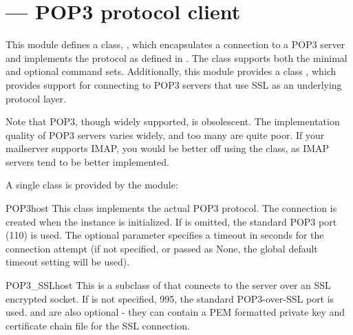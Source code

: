 \section{ ---
         POP3 protocol client}




This module defines a class, , which encapsulates a
connection to a POP3 server and implements the protocol as defined in
.  The  class supports both the minimal and
optional command sets. Additionally, this module provides a class
, which provides support for connecting to POP3
servers that use SSL as an underlying protocol layer.


Note that POP3, though widely supported, is obsolescent.  The
implementation quality of POP3 servers varies widely, and too many are
quite poor. If your mailserver supports IMAP, you would be better off
using the  class, as IMAP
servers tend to be better implemented.

A single class is provided by the  module:

\begin{classdesc}{POP3}{host}
This class implements the actual POP3 protocol.  The connection is
created when the instance is initialized.
If  is omitted, the standard POP3 port (110) is used.
The optional  parameter specifies a timeout in seconds for the
connection attempt (if not specified, or passed as None, the global default
timeout setting will be used).
\end{classdesc}

\begin{classdesc}{POP3_SSL}{host}
This is a subclass of  that connects to the server over an
SSL encrypted socket.  If  is not specified, 995, the
standard POP3-over-SSL port is used.   and 
are also optional - they can contain a PEM formatted private key and
certificate chain file for the SSL connection.

\end{classdesc}

